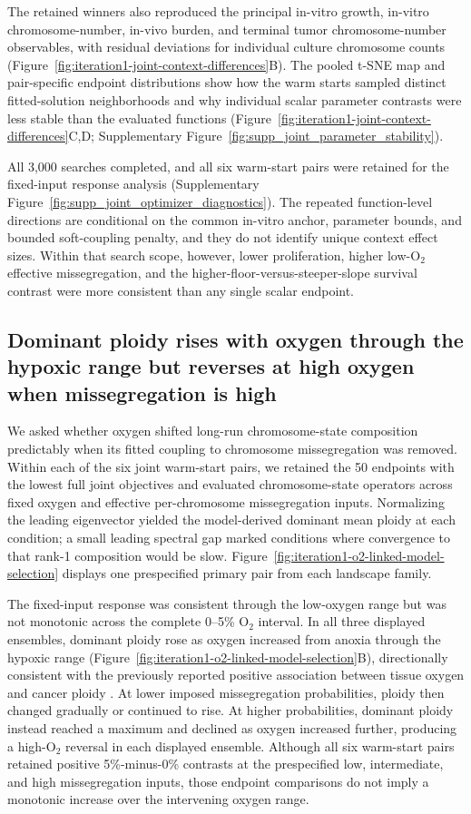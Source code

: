 \documentclass[11pt]{article}
\begin{document}
The retained winners also reproduced the principal in-vitro growth, in-vitro chromosome-number, in-vivo burden, and terminal tumor chromosome-number observables, with residual deviations for individual culture chromosome counts (Figure~\ref{fig:iteration1-joint-context-differences}B). The pooled t-SNE map and pair-specific endpoint distributions show how the warm starts sampled distinct fitted-solution neighborhoods and why individual scalar parameter contrasts were less stable than the evaluated functions (Figure~\ref{fig:iteration1-joint-context-differences}C,D; Supplementary Figure~\ref{fig:supp_joint_parameter_stability}).

All 3,000 searches completed, and all six warm-start pairs were retained for the fixed-input response analysis (Supplementary Figure~\ref{fig:supp_joint_optimizer_diagnostics}). The repeated function-level directions are conditional on the common in-vitro anchor, parameter bounds, and bounded soft-coupling penalty, and they do not identify unique context effect sizes. Within that search scope, however, lower proliferation, higher low-O$_2$ effective missegregation, and the higher-floor-versus-steeper-slope survival contrast were more consistent than any single scalar endpoint.

\subsection*{Dominant ploidy rises with oxygen through the hypoxic range but reverses at high oxygen when missegregation is high}

We asked whether oxygen shifted long-run chromosome-state composition predictably when its fitted coupling to chromosome missegregation was removed. Within each of the six joint warm-start pairs, we retained the 50 endpoints with the lowest full joint objectives and evaluated chromosome-state operators across fixed oxygen and effective per-chromosome missegregation inputs. Normalizing the leading eigenvector yielded the model-derived dominant mean ploidy at each condition; a small leading spectral gap marked conditions where convergence to that rank-1 composition would be slow. Figure~\ref{fig:iteration1-o2-linked-model-selection} displays one prespecified primary pair from each landscape family.

The fixed-input response was consistent through the low-oxygen range but was not monotonic across the complete 0--5\% O$_2$ interval. In all three displayed ensembles, dominant ploidy rose as oxygen increased from anoxia through the hypoxic range (Figure~\ref{fig:iteration1-o2-linked-model-selection}B), directionally consistent with the previously reported positive association between tissue oxygen and cancer ploidy \cite{nowicka_interactions_2025}. At lower imposed missegregation probabilities, ploidy then changed gradually or continued to rise. At higher probabilities, dominant ploidy instead reached a maximum and declined as oxygen increased further, producing a high-O$_2$ reversal in each displayed ensemble. Although all six warm-start pairs retained positive 5\%-minus-0\% contrasts at the prespecified low, intermediate, and high missegregation inputs, those endpoint comparisons do not imply a monotonic increase over the intervening oxygen range.
\end{document}
